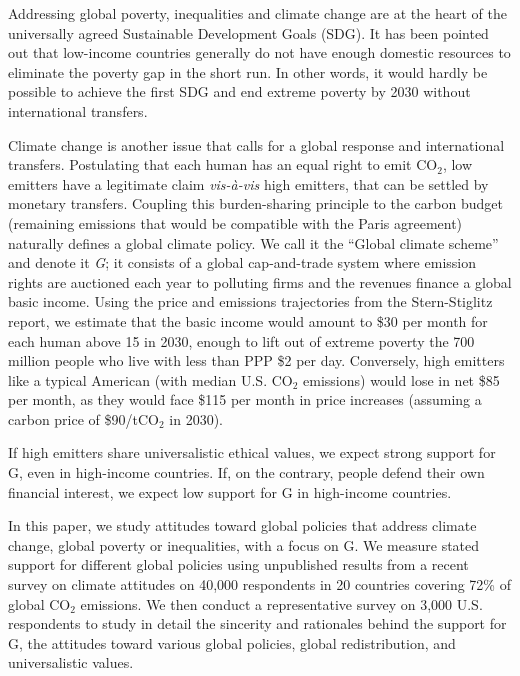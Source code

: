 \documentclass{nature}
\begin{document}
Addressing global poverty, inequalities and climate change are at the heart of the universally agreed Sustainable Development Goals (SDG). %
It has been pointed out that low-income countries generally do not have enough domestic resources to eliminate the poverty gap in the short run.\cite{bolch_arithmetics_2022} In other words, it would hardly be possible to achieve the first SDG and end extreme poverty by 2030 without international transfers. 

Climate change is another issue that calls for a global response and international transfers. Postulating %
that each human has an equal right to emit CO$_\text{2}$, low emitters have a legitimate claim \textit{vis-à-vis} high emitters, that can be settled by monetary transfers. Coupling this burden-sharing principle to the carbon budget (remaining emissions that would be compatible with the Paris agreement) naturally defines a global climate policy. We call it the ``Global climate scheme'' and denote it \textit{G}; it consists of a global cap-and-trade system where emission rights are auctioned each year to polluting firms and the revenues finance a global basic income. Using the price and emissions trajectories from the Stern-Stiglitz report,\cite{stern_report_2017} we estimate that the basic income would amount to \$30 per month for each human above 15 in 2030, enough to lift out of extreme poverty the 700 million people who live with less than PPP \$2 per day. Conversely, high emitters like a typical American (with median U.S. CO$_\text{2}$ emissions) would lose in net \$85 per month, as they would face \$115 per month in price increases (assuming a carbon price of \$90/tCO$_\text{2}$ in 2030).

If high emitters share universalistic ethical values, we expect strong support for G, even in high-income countries. If, on the contrary, people defend their own financial interest, we expect low support for G in high-income countries. 

In this paper, we study attitudes toward global policies that address climate change, global poverty or inequalities, with a focus on G. We measure stated support for different global policies using unpublished results from a recent survey\cite{dechezlepretre_fighting_2022-1} on climate attitudes on 40,000 respondents in 20 countries covering 72\% of global CO$_\text{2}$ emissions. We then conduct a representative survey on 3,000 U.S. respondents to study in detail the sincerity and rationales behind the support for G, the attitudes toward various global policies, global redistribution, and universalistic values.
\end{document}
